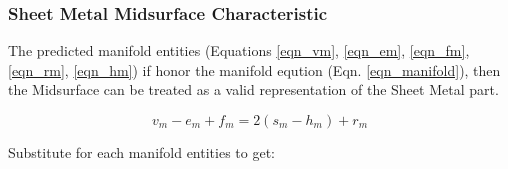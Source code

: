 %

\subsubsection{Sheet Metal Midsurface Characteristic}
The predicted manifold entities (Equations \ref{eqn_vm}, \ref{eqn_em}, \ref{eqn_fm}, \ref{eqn_rm}, \ref{eqn_hm}) if honor the manifold eqution (Eqn. \ref{eqn_manifold}), then the Midsurface can be treated as a valid representation of the Sheet Metal part. 

\begin{equation}
v_m-e_m+f_m=2(s_m-h_m )+r_m
\label{eqn_manifold}
\end{equation}

Substitute for each manifold entities to get:

